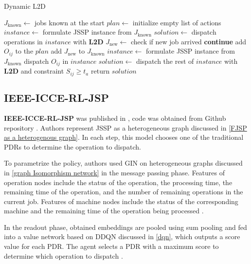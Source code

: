 \begin{algorithm}[H]
	\caption{Dynamic L2D}\label{algorithm:dqn}
	\begin{algorithmic}
	\State $J_\text{known} \gets$ jobs known at the start
    \State $plan \gets$ initialize empty list of actions 
    \State $instance \gets$ formulate JSSP instance from $J_\text{known}$
    \State $solution \gets$ dispatch operations in $instance$ with \textbf{L2D} 
        \State $J_\text{new} \gets$ check if new job arrived
            \State \textbf{continue}
        \EndIf
                \State add $O_{ij}$ to the $plan$
            \EndIf
		\EndFor
        \State add $J_\text{new}$ to $J_\text{known}$
        \State $instance \gets$ formulate JSSP instance from $J_\text{known}$
            \State dispatch $O_{ij}$ in $instance$
        \EndFor
        \State $solution \gets$ dispatch the rest of $instance$ with \textbf{L2D} and constraint $S_{ij} \geq t_a$ 
	\EndWhile
    \State return $solution$
\end{algorithmic}
\end{algorithm}

\subsection{IEEE-ICCE-RL-JSP}

\textbf{IEEE-ICCE-RL-JSP} was published in \cite{10226873}, code was obtained from Github repository \cite{github_ieee_icce_rl_jsp}. Authors represent JSSP as a heterogeneous graph discussed in \ref{FJSP as a heterogenous graph}. In each step, this model chooses one of the traditional PDRs to determine the operation to dispatch.
\par
To parametrize the policy, authors used GIN on heterogeneous graphs discussed in \ref{graph Isomorphism network} in the message passing phase. Features of operation nodes include the status of the operation, the processing time, the remaining time of the operation, and the number of remaining operations in the current job. Features of machine nodes include the status of the corresponding machine and the remaining time of the operation being processed \cite{10226873}.
\par
In the readout phase, obtained embeddings are pooled using sum pooling and fed into a value network based on DDQN discussed in \ref{dqn}, which outputs a score value for each PDR. The agent selects a PDR with a maximum score to determine which operation to dispatch \cite{10226873}.


